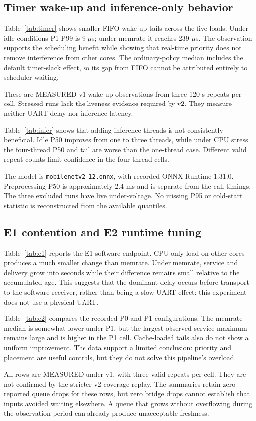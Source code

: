 \documentclass[a4paper,11pt]{article}
\newcommand{\page}{\clearpage}
\begin{document}
\subsection{Timer wake-up and inference-only behavior}
Table~\ref{tab:timer} shows smaller FIFO wake-up tails across the five loads. Under idle conditions P1 P99 is 9 $\mu$s; under memrate it reaches 239 $\mu$s. The observation supports the scheduling benefit while showing that real-time priority does not remove interference from other cores. The ordinary-policy median includes the default timer-slack effect, so its gap from FIFO cannot be attributed entirely to scheduler waiting.

These are MEASURED v1 wake-up observations from three 120 s repeats per cell. Stressed runs lack the liveness evidence required by v2. They measure neither UART delay nor inference latency.

Table~\ref{tab:infer} shows that adding inference threads is not consistently beneficial. Idle P50 improves from one to three threads, while under CPU stress the four-thread P50 and tail are worse than the one-thread case. Different valid repeat counts limit confidence in the four-thread cells.

The model is \texttt{mobilenetv2-12.onnx}, with recorded ONNX Runtime 1.31.0. Preprocessing P50 is approximately 2.4 ms and is separate from the call timings. The three excluded runs have live under-voltage. No missing P95 or cold-start statistic is reconstructed from the available quantiles.
\page
\subsection{E1 contention and E2 runtime tuning}
Table~\ref{tab:e1} reports the E1 software endpoint. CPU-only load on other cores produces a much smaller change than memrate. Under memrate, service and delivery grow into seconds while their difference remains small relative to the accumulated age. This suggests that the dominant delay occurs before transport to the software receiver, rather than being a slow UART effect: this experiment does not use a physical UART.

Table~\ref{tab:e2} compares the recorded P0 and P1 configurations. The memrate median is somewhat lower under P1, but the largest observed service maximum remains large and is higher in the P1 cell. Cache-loaded tails also do not show a uniform improvement. The data support a limited conclusion: priority and placement are useful controls, but they do not solve this pipeline's overload.

All rows are MEASURED under v1, with three valid repeats per cell. They are not confirmed by the stricter v2 coverage replay. The summaries retain zero reported queue drops for these rows, but zero bridge drops cannot establish that inputs avoided waiting elsewhere. A queue that grows without overflowing during the observation period can already produce unacceptable freshness.
\end{document}

